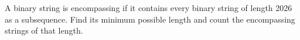 A binary string is encompassing if it contains every binary string of length 2026 as a subsequence. Find its minimum possible length and count the encompassing strings of that length.
